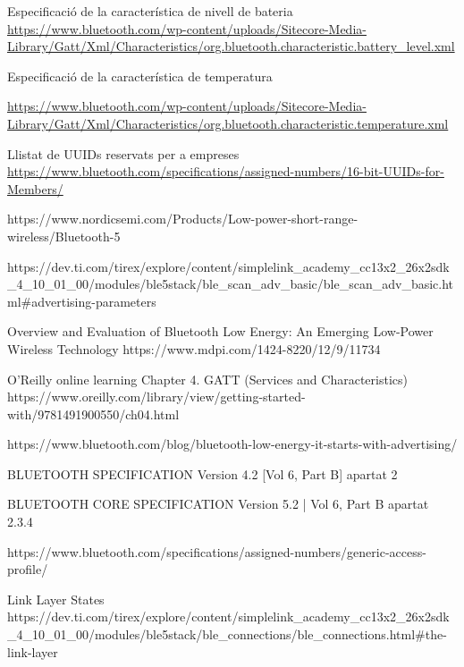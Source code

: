 \begin{thebibliography}{2}
Especificació de la característica de nivell de bateria
\href{https://www.bluetooth.com/wp-content/uploads/Sitecore-Media-Library/Gatt/Xml/Characteristics/org.bluetooth.characteristic.battery\_level.xml}{https://www.bluetooth.com/wp-content/uploads/Sitecore-Media-Library/Gatt/Xml/Characteristics/org.bluetooth.characteristic.battery\_level.xml}

Especificació de la característica de temperatura

\href{https://www.bluetooth.com/wp-content/uploads/Sitecore-Media-Library/Gatt/Xml/Characteristics/org.bluetooth.characteristic.temperature.xml}{https://www.bluetooth.com/wp-content/uploads/Sitecore-Media-Library/Gatt/Xml/Characteristics/org.bluetooth.characteristic.temperature.xml}

Llistat de UUIDs reservats per a empreses
\href{https://www.bluetooth.com/specifications/assigned-numbers/16-bit-UUIDs-for-Members/}{https://www.bluetooth.com/specifications/assigned-numbers/16-bit-UUIDs-for-Members/}

https://www.nordicsemi.com/Products/Low-power-short-range-wireless/Bluetooth-5

https://dev.ti.com/tirex/explore/content/simplelink\_academy\_cc13x2\_26x2sdk\_4\_10\_01\_00/modules/ble5stack/ble\_scan\_adv\_basic/ble\_scan\_adv\_basic.html\#advertising-parameters

Overview and Evaluation of Bluetooth Low Energy: An Emerging Low-Power Wireless Technology
https://www.mdpi.com/1424-8220/12/9/11734

O’Reilly online learning
Chapter 4. GATT (Services and Characteristics)
https://www.oreilly.com/library/view/getting-started-with/9781491900550/ch04.html

https://www.bluetooth.com/blog/bluetooth-low-energy-it-starts-with-advertising/

BLUETOOTH SPECIFICATION Version 4.2 [Vol 6, Part B] apartat 2

BLUETOOTH CORE SPECIFICATION Version 5.2 | Vol 6, Part B apartat 2.3.4

https://www.bluetooth.com/specifications/assigned-numbers/generic-access-profile/

Link Layer States
https://dev.ti.com/tirex/explore/content/simplelink\_academy\_cc13x2\_26x2sdk\_4\_10\_01\_00/modules/ble5stack/ble\_connections/ble\_connections.html\#the-link-layer


\end{thebibliography}
